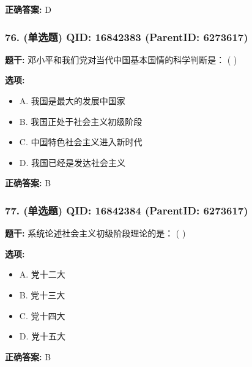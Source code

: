 \documentclass[12pt,UTF8]{ctexart}
\begin{document}
\textbf{正确答案:}
D

\vspace{0.3em}\hrulefill\vspace{0.7em}

\subsubsection*{76. (单选题) \small QID: 16842383 (ParentID: 6273617)}

\textbf{题干:}
邓小平和我们党对当代中国基本国情的科学判断是： ( )



\textbf{选项:}
\begin{itemize}[leftmargin=*]

  \item A. 我国是最大的发展中国家

  \item B. 我国正处于社会主义初级阶段

  \item C. 中国特色社会主义进入新时代

  \item D. 我国已经是发达社会主义

\end{itemize}

\textbf{正确答案:}
B

\vspace{0.3em}\hrulefill\vspace{0.7em}

\subsubsection*{77. (单选题) \small QID: 16842384 (ParentID: 6273617)}

\textbf{题干:}
系统论述社会主义初级阶段理论的是： ( )



\textbf{选项:}
\begin{itemize}[leftmargin=*]

  \item A. 党十二大

  \item B. 党十三大

  \item C. 党十四大

  \item D. 党十五大

\end{itemize}

\textbf{正确答案:}
B
\end{document}
